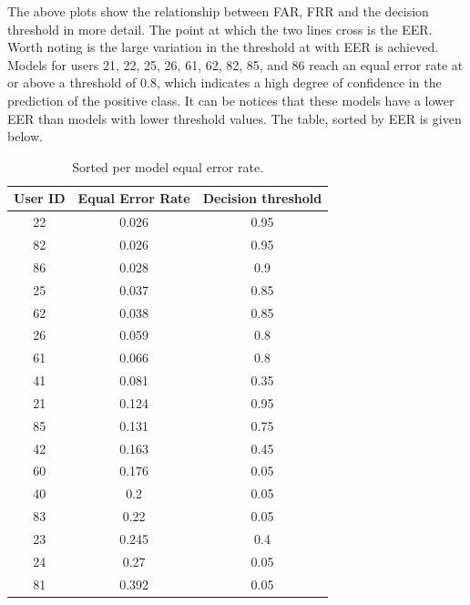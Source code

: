 The above plots show the relationship between FAR, FRR and the decision threshold in more detail. The point at which the two lines cross is the EER. Worth noting is the large variation in the threshold at with EER is achieved. Models for users 21, 22, 25, 26, 61, 62, 82, 85, and 86 reach an equal error rate at or above a threshold of 0.8, which indicates a high degree of confidence in the prediction of the positive class. It can be notices that these models have a lower EER than models with lower threshold values. The table, sorted by EER is given below.

\begin{center}
	\begin{table}[H]
		\begin{center}
			\begin{tabular}{ |c|c|c| } 
				\hline
				User ID & Equal Error Rate & Decision threshold \\
				\hline
				\hline
				22 & 0.026 & 0.95 \\
				\hline
				82 & 0.026 & 0.95 \\
				\hline
				86 & 0.028 & 0.9 \\
				\hline
				25 & 0.037 & 0.85 \\
				\hline
				62 & 0.038 & 0.85 \\
				\hline
				26 & 0.059 & 0.8 \\
				\hline
				61 & 0.066 & 0.8 \\
				\hline
				41 & 0.081 & 0.35 \\
				\hline
				21 & 0.124 & 0.95 \\
				\hline
				85 & 0.131 & 0.75 \\
				\hline
				42 & 0.163 & 0.45 \\
				\hline
				60 & 0.176 & 0.05 \\
				\hline
				40 & 0.2 & 0.05 \\
				\hline
				83 & 0.22 & 0.05 \\
				\hline
				23 & 0.245 & 0.4 \\
				\hline
				24 & 0.27 & 0.05 \\
				\hline
				81 & 0.392 & 0.05 \\
				\hline
			\end{tabular}
		\end{center}
		\caption{Sorted per model equal error rate.}
		\label{table:EER_separate_sorted}
	\end{table}
\end{center}

